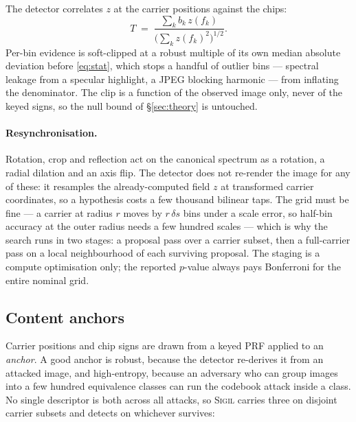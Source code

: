 \documentclass[10pt,twocolumn]{article}
\theoremstyle{definition}
\theoremstyle{remark}
\newcommand{\sigil}{\textsc{Sigil}}
\begin{document}
The detector correlates $z$ at the carrier positions against the chips:
\begin{equation}
  T \;=\; \frac{\sum_k b_k\, z(f_k)}{\bigl(\sum_k z(f_k)^{2}\bigr)^{1/2}}.
  \label{eq:stat}
\end{equation}
Per-bin evidence is soft-clipped at a robust multiple of its own median absolute
deviation before \eqref{eq:stat}, which stops a handful of outlier bins ---
spectral leakage from a specular highlight, a JPEG blocking harmonic --- from
inflating the denominator. The clip is a function of the observed image only,
never of the keyed signs, so the null bound of \S\ref{sec:theory} is untouched.

\paragraph{Resynchronisation.} Rotation, crop and reflection act on the canonical
spectrum as a rotation, a radial dilation and an axis flip. The detector does not
re-render the image for any of these: it resamples the already-computed field $z$
at transformed carrier coordinates, so a hypothesis costs a few thousand bilinear
taps. The grid must be fine --- a carrier at radius $r$ moves by $r\,\delta s$
bins under a scale error, so half-bin accuracy at the outer radius needs a few
hundred scales --- which is why the search runs in two stages: a proposal pass
over a carrier subset, then a full-carrier pass on a local neighbourhood of each
surviving proposal. The staging is a compute optimisation only; the reported
$p$-value always pays Bonferroni for the entire nominal grid.

\subsection{Content anchors}
\label{sec:anchors}

Carrier positions and chip signs are drawn from a keyed PRF applied to an
\emph{anchor}. A good anchor is robust, because the detector re-derives it from
an attacked image, and high-entropy, because an adversary who can group images
into a few hundred equivalence classes can run the codebook attack inside a
class. No single descriptor is both across all attacks, so \sigil{} carries three
on disjoint carrier subsets and detects on whichever survives:
\end{document}
